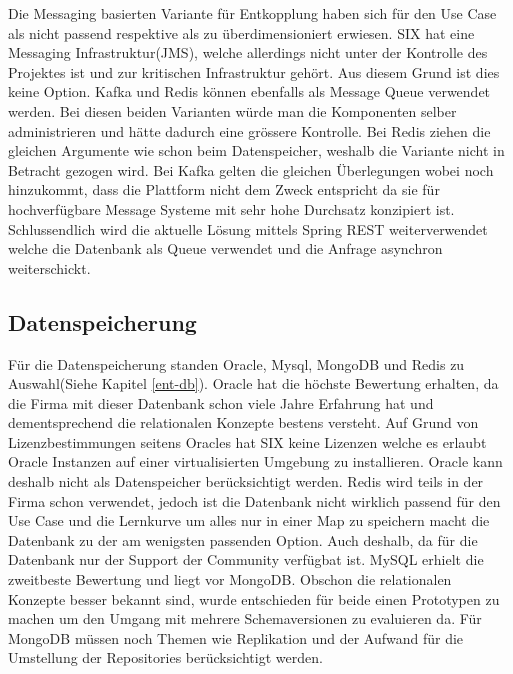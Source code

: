 Die Messaging basierten Variante für Entkopplung haben sich für den Use Case als nicht passend respektive als zu überdimensioniert erwiesen. SIX hat eine Messaging Infrastruktur(JMS), welche allerdings nicht unter der Kontrolle des Projektes ist und zur kritischen Infrastruktur gehört. Aus diesem Grund ist dies keine Option. Kafka und Redis können ebenfalls als Message Queue verwendet werden. Bei diesen beiden Varianten würde man die Komponenten selber administrieren und hätte dadurch eine grössere Kontrolle. Bei Redis ziehen die gleichen Argumente wie schon beim Datenspeicher, weshalb die Variante nicht in Betracht gezogen wird. Bei Kafka gelten die gleichen Überlegungen wobei noch hinzukommt, dass die Plattform nicht dem Zweck entspricht da sie für hochverfügbare Message Systeme mit sehr hohe Durchsatz konzipiert ist.\newline
Schlussendlich wird die aktuelle Lösung mittels Spring REST weiterverwendet welche die Datenbank als Queue verwendet und die Anfrage asynchron weiterschickt. 

\subsection{Datenspeicherung}

Für die Datenspeicherung standen Oracle, Mysql, MongoDB und Redis zu Auswahl(Siehe Kapitel \ref{ent-db}). \newline
Oracle hat die höchste Bewertung erhalten, da die Firma mit dieser Datenbank schon viele Jahre Erfahrung hat und dementsprechend die relationalen Konzepte bestens versteht. Auf Grund von Lizenzbestimmungen seitens Oracles hat SIX keine Lizenzen welche es erlaubt Oracle Instanzen auf einer virtualisierten Umgebung zu installieren. Oracle kann deshalb nicht als Datenspeicher berücksichtigt werden.\newline
Redis wird teils in der Firma schon verwendet, jedoch ist die Datenbank nicht wirklich passend für den Use Case und die Lernkurve um alles nur in einer Map zu speichern macht die Datenbank zu der am wenigsten passenden Option. Auch deshalb, da für die Datenbank nur der Support der Community verfügbat ist.\newline
MySQL erhielt die zweitbeste Bewertung und liegt vor MongoDB. Obschon die relationalen Konzepte besser bekannt sind, wurde entschieden für beide einen Prototypen zu machen um den Umgang mit mehrere Schemaversionen zu evaluieren da. Für MongoDB müssen noch Themen wie Replikation und der Aufwand für die Umstellung der Repositories berücksichtigt werden.

